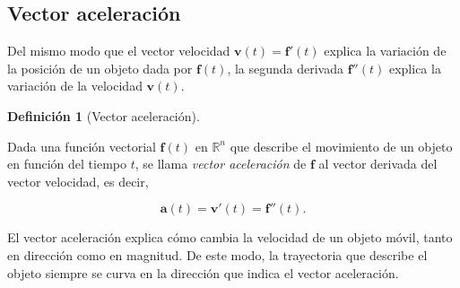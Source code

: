 \documentclass[
  a4paper,
]{scrreport}
\theoremstyle{definition}
\theoremstyle{plain}
\theoremstyle{definition}
\newtheorem{definition}{Definición}[chapter]
\theoremstyle{definition}
\theoremstyle{plain}
\theoremstyle{plain}
\theoremstyle{remark}
\begin{document}
\subsection{Vector aceleración}\label{vector-aceleraciuxf3n}

Del mismo modo que el vector velocidad \(\mathbf{v}(t)=\mathbf{f}'(t)\)
explica la variación de la posición de un objeto dada por
\(\mathbf{f}(t)\), la segunda derivada \(\mathbf{f}''(t)\) explica la
variación de la velocidad \(\mathbf{v}(t)\).

\begin{definition}[Vector
aceleración]\protect\hypertarget{def-vector-aceleracion-funcion-vectorial}{}\label{def-vector-aceleracion-funcion-vectorial}

Dada una función vectorial \(\mathbf{f}(t)\) en \(\mathbb{R}^n\) que
describe el movimiento de un objeto en función del tiempo \(t\), se
llama \emph{vector aceleración} de \(\mathbf{f}\) al vector derivada del
vector velocidad, es decir,

\[
\mathbf{a}(t) = \mathbf{v}'(t) = \mathbf{f}''(t).
\]

\end{definition}

El vector aceleración explica cómo cambia la velocidad de un objeto
móvil, tanto en dirección como en magnitud. De este modo, la trayectoria
que describe el objeto siempre se curva en la dirección que indica el
vector aceleración.
\end{document}
